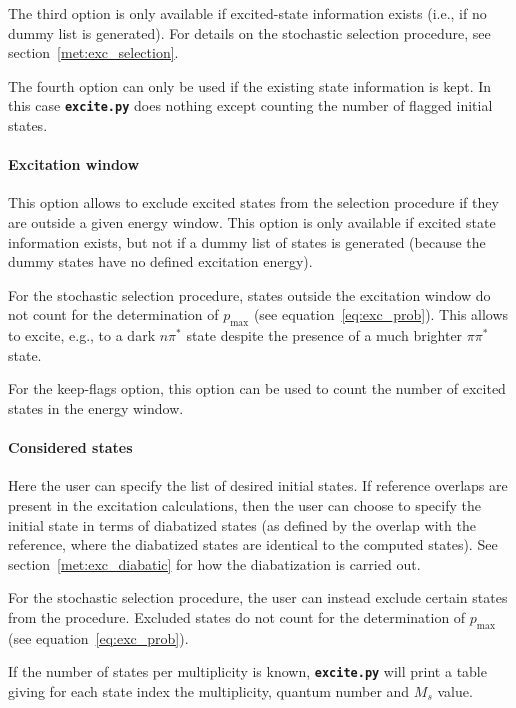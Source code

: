 \documentclass[a4paper,10pt,DIV=15,openany,twoside=false]{scrbook}
\newcommand{\ttt}[1]{\textbf{\texttt{#1}}}
\begin{document}
The third option is only available if excited-state information exists (i.e., if no dummy list is generated). For details on the stochastic selection procedure, see section~\ref{met:exc_selection}. 

The fourth option can only be used if the existing state information is kept. In this case \ttt{excite.py} does nothing except counting the number of flagged initial states.

\paragraph{Excitation window}

This option allows to exclude excited states from the selection procedure if they are outside a given energy window. This option is only available if excited state information exists, but not if a dummy list of states is generated (because the dummy states have no defined excitation energy).

For the stochastic selection procedure, states outside the excitation window do not count for the determination of $p_\text{max}$ (see equation~\eqref{eq:exc_prob}). This allows to excite, e.g., to a dark $n\pi^*$ state despite the presence of a much brighter $\pi\pi^*$ state.

For the keep-flags option, this option can be used to count the number of excited states in the energy window.

\paragraph{Considered states}

Here the user can specify the list of desired initial states. 
If reference overlaps are present in the excitation calculations, then the user can choose to specify the initial state in terms of diabatized states (as defined by the overlap with the reference, where the diabatized states are identical to the computed states).
See section~\ref{met:exc_diabatic} for how the diabatization is carried out.

For the stochastic selection procedure, the user can instead exclude certain states from the procedure. Excluded states do not count for the determination of $p_\text{max}$ (see equation~\eqref{eq:exc_prob}).

If the number of states per multiplicity is known, \ttt{excite.py} will print a table giving for each state index the multiplicity, quantum number and $M_s$ value.
\end{document}
